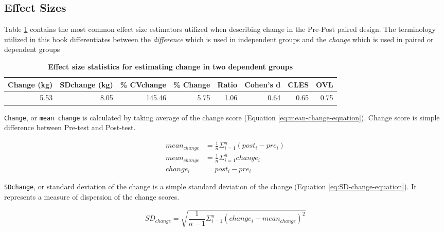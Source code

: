 \documentclass[
]{book}
\begin{document}
\hypertarget{effect-sizes-1}{%
\subsection{Effect Sizes}\label{effect-sizes-1}}

Table \ref{tab:change-effect-size} contains the most common effect size estimators utilized when describing change in the Pre-Post paired design. The terminology utilized in this book differentiates between the \emph{difference} which is used in independent groups and the \emph{change} which is used in paired or dependent groups



\begin{table}

\caption{\label{tab:change-effect-size}\textbf{Effect size statistics for estimating change in two dependent groups}}
\centering
\begin{tabular}[t]{rrrrrrrr}
\toprule
Change (kg) & SDchange (kg) & \% CVchange & \% Change & Ratio & Cohen's d & CLES & OVL\\
\midrule
5.53 & 8.05 & 145.46 & 5.75 & 1.06 & 0.64 & 0.65 & 0.75\\
\bottomrule
\end{tabular}
\end{table}

\texttt{Change}, or \texttt{mean\ change} is calculated by taking average of the change score (Equation \eqref{eq:mean-change-equation}). Change score is simple difference between Pre-test and Post-test.

\begin{equation}
  \begin{split}
    mean_{change} &= \frac{1}{n}\Sigma_{i=1}^{n}(post_{i}-pre_{i}) \\
    mean_{change} &= \frac{1}{n}\Sigma_{i=1}^{n}change_{i} \\
    change_{i} &= post_{i}-pre_{i}
  \end{split}
  \label{eq:mean-change-equation}
\end{equation}

\texttt{SDchange}, or standard deviation of the change is a simple standard deviation of the change (Equation \eqref{eq:SD-change-equation}). It represents a measure of dispersion of the change scores.

\begin{equation}
  SD_{change} = \sqrt{\frac{1}{n-1}\Sigma_{i=1}^{n}(change_i -mean_{change})^2}
  \label{eq:SD-change-equation}
\end{equation}
\end{document}
